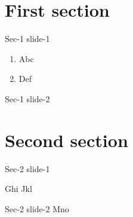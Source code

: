 \section{First section}

\begin{frame}{Sec-1 slide-1}
	\begin{enumerate}
	    \item Abc
        \item Def
	\end{enumerate}
\end{frame}

\begin{frame}{Sec-1 slide-2}
	\citet{R-base}
\end{frame}

\section{Second section}

\begin{frame}{Sec-2 slide-1}
    \begin{block}{Ghi}
        Jkl
    \end{block}
\end{frame}

\begin{frame}{Sec-2 slide-2}
	Mno
\end{frame}
